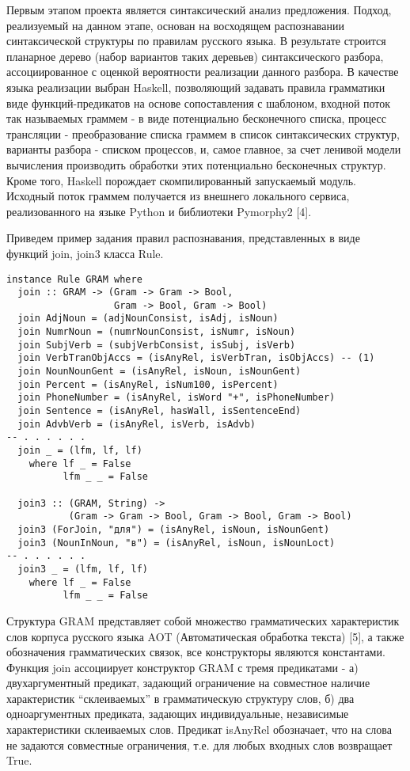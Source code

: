 \documentclass[
]{ceurart}
\begin{document}
Первым этапом проекта является синтаксический анализ предложения.
Подход, реализуемый на данном этапе, основан на восходящем распознавании
синтаксической структуры по правилам русского языка. В результате
строится планарное дерево (набор вариантов таких деревьев)
синтаксического разбора, ассоциированное с оценкой вероятности
реализации данного разбора. В качестве языка реализации выбран Haskell,
позволяющий задавать правила грамматики виде функций-предикатов на
основе сопоставления с шаблоном, входной поток так называемых граммем -
в виде потенциально бесконечного списка, процесс трансляции -
преобразование списка граммем в список синтаксических структур, варианты
разбора - списком процессов, и, самое главное, за счет ленивой модели
вычисления производить обработки этих потенциально бесконечных структур.
Кроме того, Haskell порождает скомпилированный запускаемый модуль.
Исходный поток граммем получается из внешнего локального сервиса,
реализованного на языке Python и библиотеки Pymorphy2 {[}4{]}.

Приведем пример задания правил распознавания, представленных в виде
функций join, join3 класса Rule.

{\tt\begin{verbatim}
instance Rule GRAM where
  join :: GRAM -> (Gram -> Gram -> Bool,
                   Gram -> Bool, Gram -> Bool)
  join AdjNoun = (adjNounConsist, isAdj, isNoun)
  join NumrNoun = (numrNounConsist, isNumr, isNoun)
  join SubjVerb = (subjVerbConsist, isSubj, isVerb)
  join VerbTranObjAccs = (isAnyRel, isVerbTran, isObjAccs) -- (1)
  join NounNounGent = (isAnyRel, isNoun, isNounGent)
  join Percent = (isAnyRel, isNum100, isPercent)
  join PhoneNumber = (isAnyRel, isWord "+", isPhoneNumber)
  join Sentence = (isAnyRel, hasWall, isSentenceEnd)
  join AdvbVerb = (isAnyRel, isVerb, isAdvb)
-- . . . . . .
  join _ = (lfm, lf, lf)
    where lf _ = False
          lfm _ _ = False

  join3 :: (GRAM, String) ->
           (Gram -> Gram -> Bool, Gram -> Bool, Gram -> Bool)
  join3 (ForJoin, "для") = (isAnyRel, isNoun, isNounGent)
  join3 (NounInNoun, "в") = (isAnyRel, isNoun, isNounLoct)
-- . . . . . .
  join3 _ = (lfm, lf, lf)
    where lf _ = False
          lfm _ _ = False
\end{verbatim}}

Структура GRAM представляет собой множество грамматических характеристик
слов корпуса русского языка AOT (Автоматическая обработка текста)
{[}5{]}, а также обозначения грамматических связок, все конструкторы
являются константами. Функция join ассоциирует конструктор GRAM с тремя
предикатами - а) двухаргументный предикат, задающий ограничение на
совместное наличие характеристик ``склеиваемых'' в грамматическую
структуру слов, б) два одноаргументных предиката, задающих
индивидуальные, независимые характеристики склеиваемых слов. Предикат
isAnyRel обозначает, что на слова не задаются совместные ограничения,
т.е. для любых входных слов возвращает True.
\end{document}
